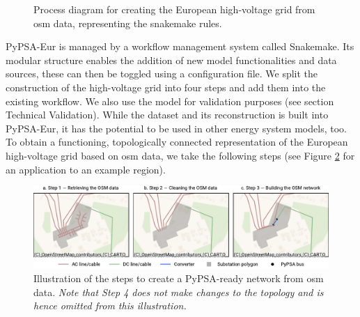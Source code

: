 \documentclass[fleqn,10pt]{wlscirep}
\let\autocite\cite
\begin{document}
\begin{figure}[h!]
    \centering
    \caption{Process diagram for creating the European high-voltage grid from \gls{osm} data, representing the snakemake rules.}
    \label{fig:osm_process}
\end{figure}

PyPSA-Eur is managed by a workflow management system called Snakemake. \autocite{molderSustainableDataAnalysis2021} Its modular structure enables the addition of new model functionalities and data sources, these can then be toggled using a configuration file. We split the construction of the high-voltage grid into four steps and add them into the existing workflow. We also use the model for validation purposes (see section Technical Validation). While the dataset and its reconstruction is built into PyPSA-Eur, it has the potential to be used in other energy system models, too. To obtain a functioning, topologically connected representation of the European high-voltage grid based on \gls{osm} data, we take the following steps (see Figure \ref{fig:all_steps} for an application to an example region).

\begin{figure}[!htbp]
    \centering
    \includegraphics{figures/fig_all_steps.pdf}
    \caption{Illustration of the steps to create a PyPSA-ready network from \gls{osm} data. \textit{Note that Step 4 does not make changes to the topology and is hence omitted from this illustration.}}
    \label{fig:all_steps}
\end{figure}
\end{document}
